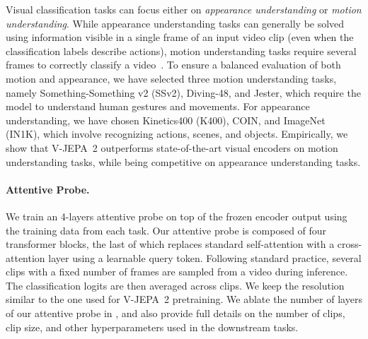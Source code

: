 \documentclass[]{fairmeta}
\newcommand{\model}{V-JEPA~2\xspace}
\begin{document}
Visual classification tasks can focus either on \emph{appearance understanding} or \emph{motion understanding}. While appearance understanding tasks can generally be solved using information visible in a single frame of an input video clip (even when the classification labels describe actions), motion understanding tasks require several frames to correctly classify a video~\citep{goyal2017something}. 
To ensure a balanced evaluation of both motion and appearance, we have selected three motion understanding tasks, namely Something-Something v2 (SSv2), Diving-48, and Jester, which require the model to understand human gestures and movements. For appearance understanding, we have chosen Kinetics400 (K400), COIN, and ImageNet (IN1K), which involve recognizing actions, scenes, and objects.
Empirically, we show that \model outperforms state-of-the-art visual encoders on motion understanding tasks, while being competitive on appearance understanding tasks.


\paragraph{\bf Attentive Probe.}
We train an 4-layers attentive probe on top of the frozen encoder output using the training data from each task. Our attentive probe is composed of four transformer blocks, the last of which replaces standard self-attention with a cross-attention layer using a learnable query token. Following standard practice, several clips with a fixed number of frames are sampled from a video during inference. The classification logits are then averaged across clips. We keep the resolution similar to the one used for \model pretraining. We ablate the number of layers of our attentive probe in , and also provide full details on the number of clips, clip size, and other hyperparameters used in the downstream tasks.
\end{document}

